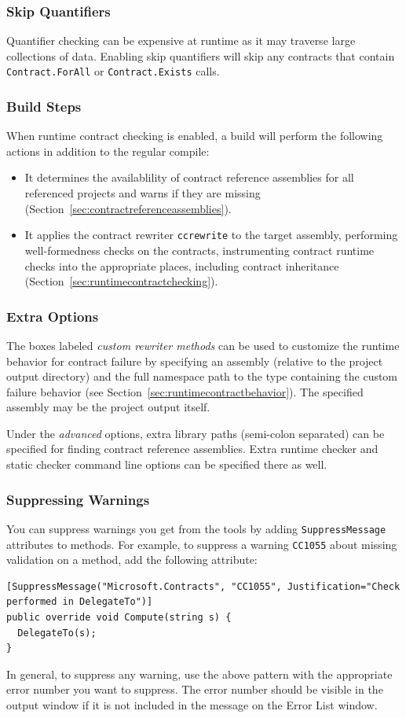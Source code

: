 \documentclass{article}
\newcommand{\code}[1]{\lstinline{#1}}
\begin{document}
\subsubsection{Skip Quantifiers}
Quantifier checking can be expensive at runtime as it may traverse
large collections of data. Enabling skip quantifiers will skip any
contracts that contain \code{Contract.ForAll} or
\code{Contract.Exists} calls.

\subsubsection{Build Steps}
\noindent
When runtime contract checking is enabled, a build will perform the
following actions in addition to the regular compile:
\begin{itemize}
\item It determines the availablility of contract reference assemblies
  for all referenced projects and warns if they are missing (Section~\ref{sec:contractreferenceassemblies}).
\item It applies the contract rewriter \code{ccrewrite} to the target assembly, performing well-formedness checks on the contracts, instrumenting contract runtime checks into the appropriate places, including contract inheritance (Section~\ref{sec:runtimecontractchecking}).
\end{itemize}

\subsubsection{Extra Options}
The boxes labeled \textit{custom rewriter methods} can be used to
customize the runtime behavior for contract failure by specifying an
assembly (relative to the project output directory) and the full
namespace path to the type containing the custom failure behavior (see
Section~\ref{sec:runtimecontractbehavior}). The specified assembly may
be the project output itself.

Under the \textit{advanced} options, extra library paths (semi-colon
separated) can be specified for finding contract reference
assemblies. Extra runtime checker and static checker command line options can be
specified there as well.

\subsubsection{Suppressing Warnings}
\label{sec:suppresswarnings}
You can suppress warnings you get from the tools by adding
\code{SuppressMessage} attributes to methods. For example,
to suppress a warning \code{CC1055} about missing validation on a
method, add the following attribute:
\begin{lstlisting}
[SuppressMessage("Microsoft.Contracts", "CC1055", Justification="Check performed in DelegateTo")] 
public override void Compute(string s) {
  DelegateTo(s);
}
\end{lstlisting}
In general, to suppress any warning, use the above pattern with the
appropriate error number you want to suppress. The error number should
be visible in the output window if it is not included in the message
on the Error List window.
\end{document}
